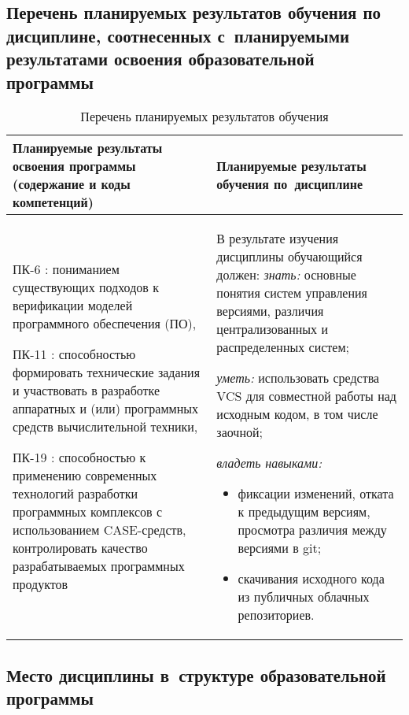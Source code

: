 \documentclass[a4paper,12pt]{article}
\begin{document}
  



\subsection{Перечень планируемых результатов обучения по дисциплине, соотнесенных с~планируемыми результатами освоения образовательной программы}

\begin{longtable}{|p{54mm}|p{100mm}|}
  \caption{Перечень планируемых результатов обучения}\\
  \hline
  \centering
  Планируемые результаты освоения программы (содержание и коды компетенций) & 
  \centering\arraybackslash
  Планируемые результаты обучения по~дисциплине
  \\
  \hline
  
  ПК-6 : пониманием существующих подходов к верификации моделей программного обеспечения (ПО), \par 
  
  ПК-11 : способностью формировать технические задания и участвовать в разработке аппаратных и (или) программных средств вычислительной техники, \par 
  
  ПК-19 : способностью к применению современных технологий разработки программных комплексов с использованием CASE-средств, контролировать качество разрабатываемых программных продуктов
  & 
  В результате изучения дисциплины обучающийся должен:\newline
  \emph{знать:}
  основные понятия систем управления версиями, различия централизованных и распределенных систем;
  

  \emph{уметь:}
  использовать средства VCS для совместной работы над исходным кодом, в том числе заочной;
  

  \emph{владеть навыками:}
  \begin{itemize}[leftmargin=12pt]
    \item фиксации изменений, отката к предыдущим версиям, просмотра различия между версиями в git; 
    \item скачивания исходного кода из публичных облачных репозиториев. 
  \end{itemize}
  
  \\
  \hline
  \end{longtable}


\subsection{Место дисциплины в~структуре образовательной программы}
\end{document}
